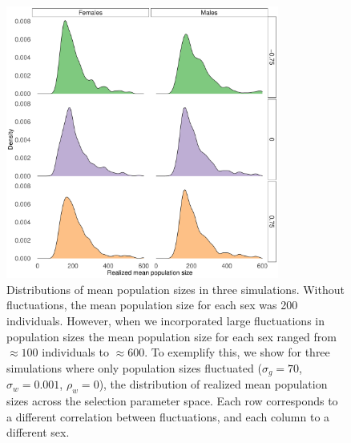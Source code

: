\documentclass[12pt]{article}
\begin{document}
\clearpage
\begin{figure}[H]
  \centerline{\includegraphics[width=0.8\textwidth]{realized_average.pdf}}
  \caption{ Distributions of mean population sizes in three simulations. Without fluctuations, the mean population size for each sex was 200 individuals. However, when we incorporated large fluctuations in population sizes the mean population size for each sex ranged from $\approx 100$ individuals to $\approx 600$. To exemplify this, we show for three simulations where only population sizes fluctuated ($\sigma_{g}=70$, $\sigma_{w}=0.001$, $\rho_{w}=0$), the distribution of realized mean population sizes across the selection parameter space. Each row corresponds to a different correlation between fluctuations, and each column to a different sex.  }

\end{figure}

\clearpage
\end{document}

